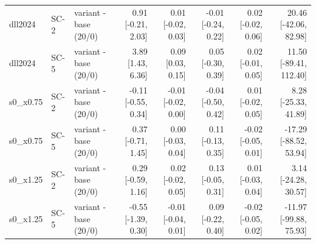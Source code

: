 \begin{table}[htbp]
{\begin{tabular}{lllrrrrr}
dll2024 & SC-2 & variant - base (20/0) & 0.91 [-0.21, 2.03] & 0.01 [-0.02, 0.03] & -0.01 [-0.24, 0.22] & 0.02 [-0.02, 0.06] & 20.46 [-42.06, 82.98] \\
dll2024 & SC-5 & variant - base (20/0) & 3.89 [1.43, 6.36] & 0.09 [0.03, 0.15] & 0.05 [-0.30, 0.39] & 0.02 [-0.01, 0.05] & 11.50 [-89.41, 112.40] \\
s0\_x0.75 & SC-2 & variant - base (20/0) & -0.11 [-0.55, 0.34] & -0.01 [-0.02, 0.00] & -0.04 [-0.50, 0.42] & 0.01 [-0.02, 0.05] & 8.28 [-25.33, 41.89] \\
s0\_x0.75 & SC-5 & variant - base (20/0) & 0.37 [-0.71, 1.45] & 0.00 [-0.03, 0.04] & 0.11 [-0.13, 0.35] & -0.02 [-0.05, 0.01] & -17.29 [-88.52, 53.94] \\
s0\_x1.25 & SC-2 & variant - base (20/0) & 0.29 [-0.59, 1.16] & 0.02 [-0.02, 0.05] & 0.13 [-0.05, 0.31] & 0.01 [-0.03, 0.04] & 3.14 [-24.28, 30.57] \\
s0\_x1.25 & SC-5 & variant - base (20/0) & -0.55 [-1.39, 0.30] & -0.01 [-0.04, 0.01] & 0.09 [-0.22, 0.40] & -0.02 [-0.05, 0.02] & -11.97 [-99.88, 75.93] \\
\bottomrule
\end{tabular}}
\end{table}
